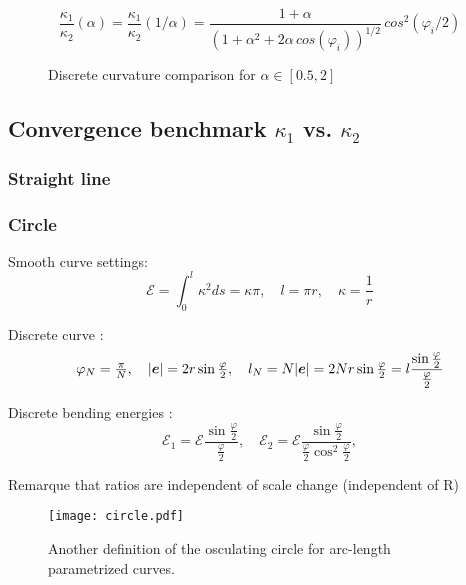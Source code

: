 \begin{equation}
	\frac{\kappa_1}{\kappa_2}(\alpha) = \frac{\kappa_1}{\kappa_2}(1/\alpha)= \frac{1+\alpha}{(1+ \alpha^2 + 2 \alpha \, cos(\varphi_i))^{1/2}} \, cos^2(\varphi_i/2)
\end{equation}

\begin{figure}[H]
\begin{center}

\end{center}
\caption{Discrete curvature comparison for $\alpha \in [0.5,2]$}
\end{figure}

\subsection{Convergence benchmark $\kappa_1$ vs. $\kappa_2$}

\subsubsection{Straight line}

\subsubsection{Circle}

Smooth curve settings:
\begin{equation}
	\mathcal{E} = \int_0^l \kappa^2 ds = \kappa \pi,
	\quad
	l = \pi r,
	\quad
	\kappa = \frac{1}{r}
\end{equation}

Discrete curve :
\begin{equation}
	\varphi_N = \tfrac{\pi}{N},
	\quad
	|\boldsymbol{e}| = 2r\sin \tfrac{\varphi}{2},
	\quad
	l_N = N|\boldsymbol{e}| =2Nr\sin \tfrac{\varphi}{2} = l \frac{\sin \tfrac{\varphi}{2}}{\tfrac{\varphi}{2}}
\end{equation}

Discrete bending energies :
\begin{equation}
	\mathcal{E}_1 = \mathcal{E} \frac{\sin \tfrac{\varphi}{2}}{\tfrac{\varphi}{2}},
	\quad
	\mathcal{E}_2 = \mathcal{E} \frac{\sin \tfrac{\varphi}{2}}{\tfrac{\varphi}{2} \cos^2 \tfrac{\varphi}{2}},
\end{equation}

Remarque that ratios are independent of scale change (independent of R)

\begin{figure}[H]
\begin{center}
\texttt{[image: circle.pdf]}
\caption{Another definition of the osculating circle for arc-length parametrized curves.}
\label{fig:1_1}
\end{center}
\end{figure}

